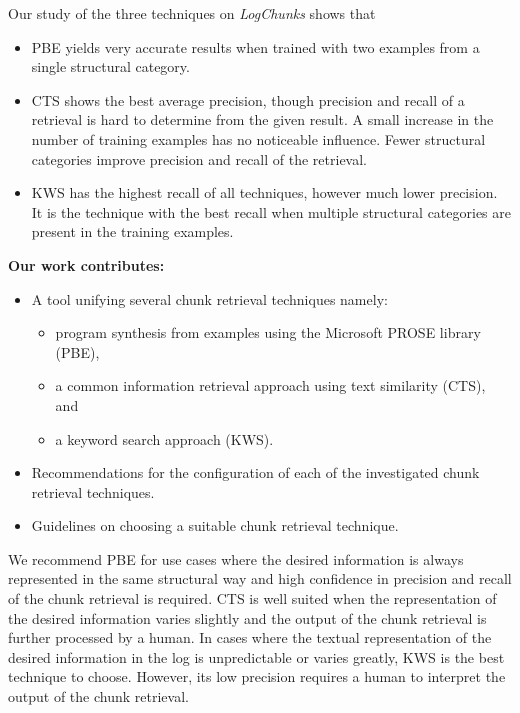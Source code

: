 Our study of the three techniques on \emph{LogChunks} shows that
\begin{itemize}
  \item PBE yields very accurate results when trained with two examples from a single structural category.
  \item CTS shows the best average precision, though precision and recall of a retrieval is hard to determine from the given result.
  A small increase in the number of training examples has no noticeable influence.
  Fewer structural categories improve precision and recall of the retrieval.
  \item KWS has the highest recall of all techniques, however much lower precision.
  It is the technique with the best recall when multiple structural categories are present in the training examples.
\end{itemize}

\noindent
\textbf{Our work contributes:}
\begin{itemize}
  \item A tool unifying several chunk retrieval techniques namely:
        \begin{itemize}
          \item program synthesis from examples using the Microsoft PROSE library (PBE),
          \item a common information retrieval approach using text similarity (CTS), and
          \item a keyword search approach (KWS).
        \end{itemize}
  \item Recommendations for the configuration of each of the investigated chunk retrieval techniques.
  \item Guidelines on choosing a suitable chunk retrieval technique.
\end{itemize}

We recommend PBE for use cases where the desired information is always
represented in the same structural way and high confidence in precision and
recall of the chunk retrieval is required.
CTS is well suited when the representation of the desired information varies
slightly and the output of the chunk retrieval is further processed by a human.
In cases where the textual representation of the desired information in the log
is unpredictable or varies greatly, KWS is the best technique to choose.
However, its low precision requires a human to interpret the output of the chunk
retrieval.


